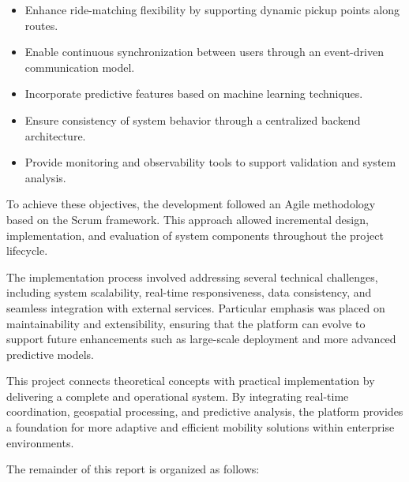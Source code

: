 \begin{itemize}
\item Enhance ride-matching flexibility by supporting dynamic pickup points along routes.
\item Enable continuous synchronization between users through an event-driven communication model.
\item Incorporate predictive features based on machine learning techniques.
\item Ensure consistency of system behavior through a centralized backend architecture.
\item Provide monitoring and observability tools to support validation and system analysis.
\end{itemize}

To achieve these objectives, the development followed an Agile methodology based on the Scrum framework. This approach allowed incremental design, implementation, and evaluation of system components throughout the project lifecycle.

The implementation process involved addressing several technical challenges, including system scalability, real-time responsiveness, data consistency, and seamless integration with external services. Particular emphasis was placed on maintainability and extensibility, ensuring that the platform can evolve to support future enhancements such as large-scale deployment and more advanced predictive models.

This project connects theoretical concepts with practical implementation by delivering a complete and operational system. By integrating real-time coordination, geospatial processing, and predictive analysis, the platform provides a foundation for more adaptive and efficient mobility solutions within enterprise environments.

The remainder of this report is organized as follows:

